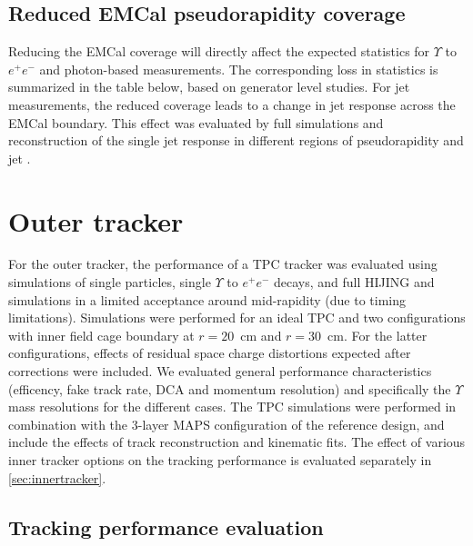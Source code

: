 \subsection{Reduced EMCal pseudorapidity coverage}
Reducing the EMCal coverage will directly affect the expected statistics for $\Upsilon$ to $e^+ e^-$ and photon-based measurements. The 
corresponding loss in statistics is summarized in the table below, based on generator level studies. For jet measurements, the reduced 
coverage leads to a change in jet response across the EMCal boundary. This effect was evaluated by full \geant simulations and reconstruction
of the single jet response in different regions of pseudorapidity and jet \pt.

\section{Outer tracker}

For the outer tracker, the performance of a TPC tracker was evaluated using \geant simulations of single particles, single $\Upsilon$ to $e^+ e^-$
decays, and full HIJING and \geant simulations in a limited acceptance around mid-rapidity (due to timing limitations). Simulations were performed
for an ideal TPC and two configurations with inner field cage boundary at $r=20$~cm and $r=30$~cm. For the latter configurations, effects of 
residual space charge distortions expected after corrections were included. We evaluated general performance characteristics (efficency, fake track
rate, DCA and momentum resolution) and specifically the $\Upsilon$ mass resolutions for the different cases. The TPC simulations were performed
in combination with the 3-layer MAPS configuration of the reference design, and include the effects of track reconstruction and kinematic fits. 
The effect of various inner tracker options on the tracking performance is evaluated separately in \ref{sec:innertracker}.
\subsection{Tracking performance evaluation}

